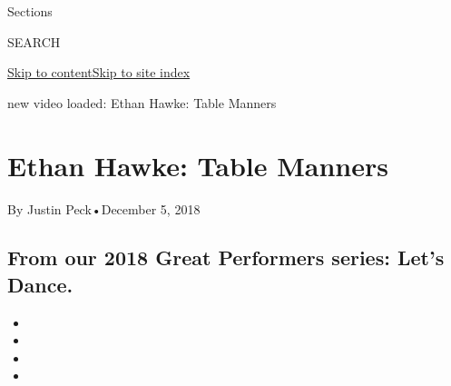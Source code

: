 Sections

SEARCH

\protect\hyperlink{site-content}{Skip to
content}\protect\hyperlink{site-index}{Skip to site index}

new video loaded: Ethan Hawke: Table Manners

\hypertarget{ethan-hawke-table-manners}{%
\section{Ethan Hawke: Table Manners}\label{ethan-hawke-table-manners}}

By Justin Peck•December 5, 2018

\hypertarget{from-our-2018-great-performers-series-lets-dance}{%
\subsection{From our 2018 Great Performers series: Let's
Dance.}\label{from-our-2018-great-performers-series-lets-dance}}

\begin{itemize}
\item
\item
\item
\item
\end{itemize}

